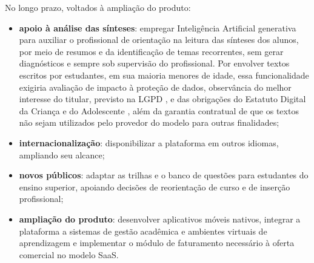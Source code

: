 No longo prazo, voltados à ampliação do produto:

\begin{itemize}
  \item \textbf{apoio à análise das sínteses}: empregar Inteligência Artificial generativa para auxiliar o profissional de orientação na leitura das sínteses dos alunos, por meio de resumos e da identificação de temas recorrentes, sem gerar diagnósticos e sempre sob supervisão do profissional. Por envolver textos escritos por estudantes, em sua maioria menores de idade, essa funcionalidade exigiria avaliação de impacto à proteção de dados, observância do melhor interesse do titular, previsto na LGPD \cite{brasil2018lgpd}, e das obrigações do Estatuto Digital da Criança e do Adolescente \cite{brasil2025lei15211}, além da garantia contratual de que os textos não sejam utilizados pelo provedor do modelo para outras finalidades;
  \item \textbf{internacionalização}: disponibilizar a plataforma em outros idiomas, ampliando seu alcance;
  \item \textbf{novos públicos}: adaptar as trilhas e o banco de questões para estudantes do ensino superior, apoiando decisões de reorientação de curso e de inserção profissional;
  \item \textbf{ampliação do produto}: desenvolver aplicativos móveis nativos, integrar a plataforma a sistemas de gestão acadêmica e ambientes virtuais de aprendizagem e implementar o módulo de faturamento necessário à oferta comercial no modelo SaaS.
\end{itemize}
